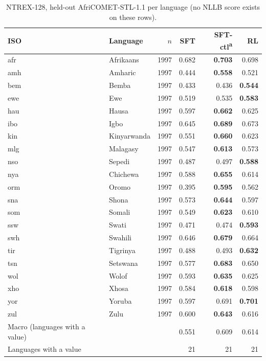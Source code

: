 \begin{table}[t]
\centering\footnotesize
\setlength{\tabcolsep}{3pt}
\begin{tabular}{@{}llrrrr@{}}
\toprule
ISO & Language & $n$ & SFT & SFT-ctl\textsuperscript{a} & RL \\
\midrule
afr & Afrikaans & 1997 & 0.682 & \textbf{0.703} & 0.698 \\
amh & Amharic & 1997 & 0.444 & \textbf{0.558} & 0.521 \\
bem & Bemba & 1997 & 0.433 & 0.436 & \textbf{0.544} \\
ewe & Ewe & 1997 & 0.519 & 0.535 & \textbf{0.583} \\
hau & Hausa & 1997 & 0.597 & \textbf{0.662} & 0.625 \\
ibo & Igbo & 1997 & 0.645 & \textbf{0.689} & 0.673 \\
kin & Kinyarwanda & 1997 & 0.551 & \textbf{0.660} & 0.623 \\
mlg & Malagasy & 1997 & 0.547 & \textbf{0.613} & 0.573 \\
nso & Sepedi & 1997 & 0.487 & 0.497 & \textbf{0.588} \\
nya & Chichewa & 1997 & 0.588 & \textbf{0.655} & 0.614 \\
orm & Oromo & 1997 & 0.395 & \textbf{0.595} & 0.562 \\
sna & Shona & 1997 & 0.573 & \textbf{0.644} & 0.597 \\
som & Somali & 1997 & 0.549 & \textbf{0.623} & 0.610 \\
ssw & Swati & 1997 & 0.471 & 0.474 & \textbf{0.593} \\
swh & Swahili & 1997 & 0.646 & \textbf{0.679} & 0.664 \\
tir & Tigrinya & 1997 & 0.488 & 0.493 & \textbf{0.632} \\
tsn & Setswana & 1997 & 0.577 & \textbf{0.683} & 0.650 \\
wol & Wolof & 1997 & 0.593 & \textbf{0.635} & 0.625 \\
xho & Xhosa & 1997 & 0.584 & \textbf{0.618} & 0.598 \\
yor & Yoruba & 1997 & 0.597 & 0.691 & \textbf{0.701} \\
zul & Zulu & 1997 & 0.600 & \textbf{0.643} & 0.616 \\
\midrule
Macro (languages with a value) & & & 0.551 & 0.609 & 0.614 \\
Languages with a value & & & 21 & 21 & 21 \\
\bottomrule
\end{tabular}
\caption{NTREX-128, held-out AfriCOMET-STL-1.1 per language (no NLLB score exists on these rows).}
\label{tab:full-ntrex-comet}
\end{table}
